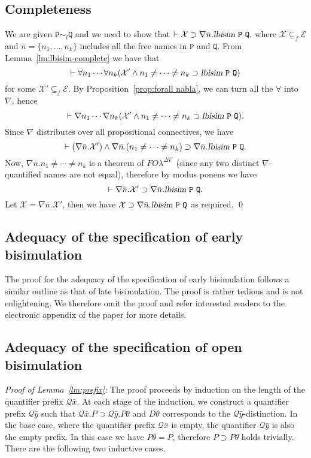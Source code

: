 \documentclass{acmtrans2m}
\def\Escr{{\mathcal E}}
\def\Qscr{{\mathcal Q}}
\def\Xscr{{\mathcal X}}
\def\Ppi{{\mathtt P}}
\def\Qpi{{\mathtt Q}}
\newcommand{\FOL   }{FO\lambda}
\newcommand{\FOLDNb}{\FOL^{\Delta\nabla}}
\newcommand{\lbisim}[2]{\hbox{\sl lbisim}~#1~#2}
\newcommand{\oimp}{\supset}
\begin{document}
\subsection{Completeness} We are given $\Ppi \sim_l \Qpi$ and
we need to show that $\vdash \Xscr \oimp \nabla\bar{n}.\lbisim \Ppi \Qpi,$ where 
$\Xscr \subseteq_f \Escr$ and $\bar n = \{n_1, \ldots, n_k \}$ includes all the free names in
$\Ppi$ and $\Qpi.$ From Lemma~\ref{lm:lbisim-complete} we have that 
$$
\vdash \forall n_1 \cdots \forall n_k (\Xscr' \land n_1 \not = \cdots \not = n_k \oimp \lbisim \Ppi \Qpi)
$$
for some $\Xscr' \subseteq_f \Escr$. By Proposition~\ref{prop:forall nabla},
we can turn all the $\forall$ into $\nabla$, hence
$$
\vdash \nabla n_1 \cdots \nabla n_k (\Xscr' \land n_1 \not = \cdots \not = n_k \oimp \lbisim \Ppi \Qpi).
$$
Since $\nabla$ distributes over all propositional connectives, we have
$$
\vdash (\nabla \bar n. \Xscr') \land \nabla \bar n. (n_1 \not = \cdots \not = n_k) \oimp \nabla \bar n. \lbisim \Ppi \Qpi.
$$
Now, $\nabla \bar n. n_1 \not = \cdots \not = n_k$ is a theorem of $\FOLDNb$ (since any
two distinct $\nabla$-quantified names are not equal), therefore by modus ponens
we have
$$
\vdash \nabla \bar n. \Xscr' \oimp \nabla \bar n. \lbisim \Ppi \Qpi.
$$
Let $\Xscr = \nabla \bar n.\Xscr'$, then we have $\Xscr \oimp \nabla \bar n.\lbisim \Ppi \Qpi$
as required.
\qed


\subsection{Adequacy of the specification of early bisimulation}

The proof for the adequacy of the specification of early bisimulation follows a 
similar outline as that of late bisimulation. The proof is rather tedious and is not
enlightening. We therefore omit the proof and refer interested readers to
the electronic appendix of the paper for more details.

\subsection{Adequacy of the specification of open bisimulation}

{\em Proof of Lemma~\ref{lm:prefix}: }
The proof proceeds by induction on the length of the quantifier prefix $\Qscr \bar x.$
At each stage of the induction, we construct a quantifier prefix $\Qscr \bar y$
such that $\Qscr \bar x.P \oimp \Qscr \bar y.P\theta$ and $D\theta$ corresponds to
the $\Qscr \bar y$-distinction.
In the base case, where the quantifier prefix $\Qscr \bar x$ is empty, the quantifier
$\Qscr \bar y$ is also the empty prefix. In this case we have
$P\theta = P$, therefore $P \oimp P\theta$ holds trivially.
There are the following two inductive cases.
\end{document}
